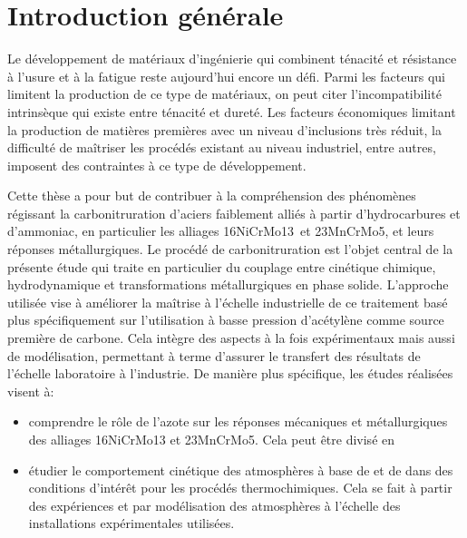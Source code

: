 \chapter*{Introduction générale}

Le développement de matériaux d'ingénierie qui combinent ténacité et résistance à l'usure et à la fatigue reste aujourd'hui encore un défi. Parmi les facteurs qui limitent la production de ce type de matériaux, on peut citer l'incompatibilité intrinsèque qui existe entre ténacité et dureté. Les facteurs économiques limitant la production de matières premières avec un niveau d'inclusions très réduit, la difficulté de maîtriser les procédés existant au niveau industriel, entre autres, imposent des contraintes à ce type de développement.

Cette thèse a pour but de contribuer à la compréhension des phénomènes régissant la carbonitruration d'aciers faiblement alliés à partir d'hydrocarbures et d'ammoniac, en particulier les alliages 16NiCrMo13 et 23MnCrMo5, et leurs réponses métallurgiques. Le procédé de carbonitruration est l'objet central de la présente étude qui traite en particulier du couplage entre cinétique chimique, hydrodynamique et transformations métallurgiques en phase solide. L'approche utilisée vise à améliorer la maîtrise à l'échelle industrielle de ce traitement basé plus spécifiquement sur l'utilisation à basse pression d'acétylène comme source première de carbone. Cela intègre des aspects à la fois expérimentaux mais aussi de modélisation, permettant à terme d'assurer le transfert des résultats de l'échelle laboratoire à l'industrie. De manière plus spécifique, les études réalisées visent à:
\begin{itemize}
  \item comprendre le rôle de l'azote sur les réponses mécaniques et métallurgiques des alliages 16NiCrMo13 et 23MnCrMo5. Cela peut être divisé en
  \item étudier le comportement cinétique des atmosphères à base de  et de  dans des conditions d'intérêt pour les procédés thermochimiques. Cela se fait à partir des expériences et par modélisation des atmosphères à l'échelle des installations expérimentales utilisées.
\end{itemize}

